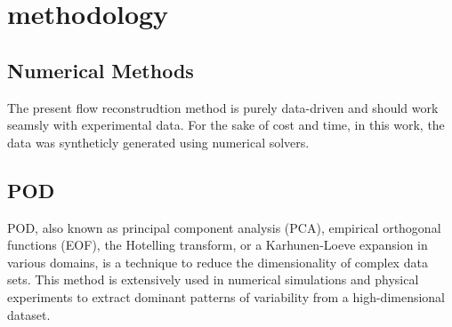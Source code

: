 


\chapter{methodology}
\label{chap:methodology}

\section{Numerical Methods}

The present flow reconstrudtion method is purely data-driven and should work seamsly with experimental data. For the sake of cost and time, in this work, the data was syntheticly generated using numerical solvers. 


\section{POD}

POD, also known as principal component analysis (PCA), empirical orthogonal functions (EOF), the Hotelling transform, or a Karhunen-Loeve expansion in various domains, is a technique to reduce the dimensionality of complex data sets. This method is extensively used in numerical simulations and physical experiments to extract dominant patterns of variability from a high-dimensional dataset.